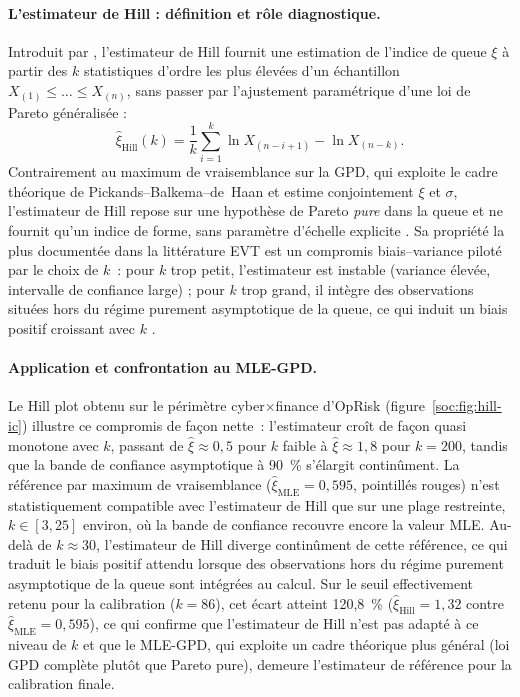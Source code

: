 \paragraph{L'estimateur de Hill : définition et rôle diagnostique.}
Introduit par \citet{Hill1975}, l'estimateur de Hill fournit une estimation
de l'indice de queue $\xi$ à partir des $k$ statistiques d'ordre les plus
élevées d'un échantillon $X_{(1)} \leq \dots \leq X_{(n)}$, sans passer par
l'ajustement paramétrique d'une loi de Pareto généralisée :
\begin{equation}
\hat{\xi}_{\text{Hill}}(k) = \frac{1}{k}\sum_{i=1}^{k}
\ln X_{(n-i+1)} - \ln X_{(n-k)}.
\label{soc:eq:hill}
\end{equation}
Contrairement au maximum de vraisemblance sur la GPD, qui exploite le cadre
théorique de Pickands--Balkema--de~Haan et estime conjointement $\xi$ et
$\sigma$, l'estimateur de Hill repose sur une hypothèse de Pareto \emph{pure}
dans la queue et ne fournit qu'un indice de forme, sans paramètre d'échelle
explicite \citep{Beirlant2004}. Sa propriété la plus documentée dans la
littérature EVT est un compromis biais--variance piloté par le choix de
$k$~: pour $k$ trop petit, l'estimateur est instable (variance élevée,
intervalle de confiance large) ; pour $k$ trop grand, il intègre des
observations situées hors du régime purement asymptotique de la queue, ce
qui induit un biais positif croissant avec $k$ \citep{Embrechts1997,
Beirlant2004}.

\paragraph{Application et confrontation au MLE-GPD.} Le Hill plot obtenu sur
le périmètre cyber$\times$finance d'OpRisk (figure~\ref{soc:fig:hill-ic})
illustre ce compromis de façon nette~: l'estimateur croît de façon quasi
monotone avec $k$, passant de $\hat{\xi} \approx 0{,}5$ pour $k$ faible à
$\hat{\xi} \approx 1{,}8$ pour $k = 200$, tandis que la bande de confiance
asymptotique à 90~\% s'élargit continûment. La référence par maximum de
vraisemblance ($\hat{\xi}_{\text{MLE}} = 0{,}595$, pointillés rouges) n'est
statistiquement compatible avec l'estimateur de Hill que sur une plage
restreinte, $k \in [3, 25]$ environ, où la bande de confiance recouvre
encore la valeur MLE. Au-delà de $k \approx 30$, l'estimateur de Hill
diverge continûment de cette référence, ce qui traduit le biais positif
attendu lorsque des observations hors du régime purement asymptotique de la
queue sont intégrées au calcul. Sur le seuil effectivement retenu pour la
calibration ($k = 86$), cet écart atteint 120{,}8~\%
($\hat{\xi}_{\text{Hill}} = 1{,}32$ contre $\hat{\xi}_{\text{MLE}} = 0{,}595$),
ce qui confirme que l'estimateur de Hill n'est pas adapté à ce niveau de
$k$ et que le MLE-GPD, qui exploite un cadre théorique plus général
(loi GPD complète plutôt que Pareto pure), demeure l'estimateur de
référence pour la calibration finale.

